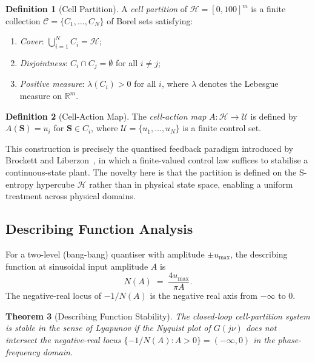 \documentclass[10pt,twocolumn]{article}
\theoremstyle{plain}
\newtheorem{theorem}{Theorem}[section]
\theoremstyle{definition}
\newtheorem{definition}[theorem]{Definition}
\theoremstyle{remark}
\newcommand{\R}{\mathbb{R}}
\newcommand{\Hcal}{\mathcal{H}}
\newcommand{\Ccal}{\mathcal{C}}
\newcommand{\Ucal}{\mathcal{U}}
\begin{document}
\begin{definition}[Cell Partition]
\label{def:cell}
A \emph{cell partition} of $\Hcal = [0,100]^m$ is a finite collection
$\Ccal = \{C_1,\ldots,C_N\}$ of Borel sets satisfying:
\begin{enumerate}
  \item \emph{Cover}: $\bigcup_{i=1}^N C_i = \Hcal$;
  \item \emph{Disjointness}: $C_i \cap C_j = \emptyset$ for all
        $i \neq j$;
  \item \emph{Positive measure}: $\lambda(C_i) > 0$ for all $i$,
        where $\lambda$ denotes the Lebesgue measure on $\R^m$.
\end{enumerate}
\end{definition}

\begin{definition}[Cell-Action Map]
\label{def:cellaction}
The \emph{cell-action map} $A: \Hcal \to \Ucal$ is defined by
$A(\mathbf{S}) = u_i$ for $\mathbf{S} \in C_i$, where
$\Ucal = \{u_1,\ldots,u_N\}$ is a finite control set.
\end{definition}

This construction is precisely the quantised feedback paradigm
introduced by Brockett and Liberzon~\cite{Brockett2000}, in which a
finite-valued control law suffices to stabilise a continuous-state
plant.  The novelty here is that the partition is defined on the
S-entropy hypercube $\Hcal$ rather than in physical state space,
enabling a uniform treatment across physical domains.

\subsection{Describing Function Analysis}
\label{ssec:df}

For a two-level (bang-bang) quantiser with amplitude $\pm u_{\max}$,
the describing function at sinusoidal input amplitude $A$ is
\begin{equation}
  N(A) \;=\; \frac{4u_{\max}}{\pi A}.
  \label{eq:df}
\end{equation}
The negative-real locus of $-1/N(A)$ is the negative real axis from
$-\infty$ to $0$.

\begin{theorem}[Describing Function Stability]
\label{thm:dfstab}
The closed-loop cell-partition system is stable in the sense of
Lyapunov if the Nyquist plot of $G(j\nu)$ does not intersect the
negative-real locus $\{-1/N(A) : A > 0\} = (-\infty, 0)$ in the
phase-frequency domain.
\end{theorem}
\end{document}
